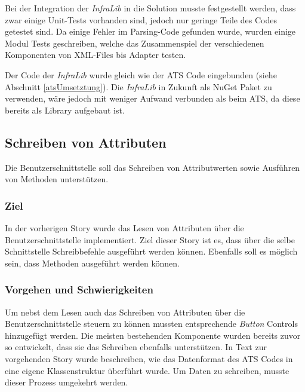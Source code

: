 Bei der Integration der \textit{InfraLib} in die Solution musste festgestellt werden, dass zwar einige Unit-Tests vorhanden sind, jedoch nur geringe Teile des Codes getestet sind.
Da einige Fehler im Parsing-Code gefunden wurde, wurden einige Modul Tests geschreiben, welche das Zusammenspiel der verschiedenen Komponenten von XML-Files bis Adapter testen.

Der Code der \textit{InfraLib} wurde gleich wie der \ac{ATS} Code eingebunden (siehe Abschnitt \ref{atsUmsetztung}).
Die \textit{InfraLib} in Zukunft als NuGet Paket zu verwenden, wäre jedoch mit weniger Aufwand verbunden als beim \ac{ATS}, da diese bereits als Library aufgebaut ist.

\subsection{Schreiben von Attributen}
\dq Die Benutzerschnittstelle soll das Schreiben von Attributwerten sowie Ausführen von Methoden unterstützen.\dq

\subsubsection{Ziel}
In der vorherigen Story wurde das Lesen von Attributen über die Benutzerschnittstelle implementiert.
Ziel dieser Story ist es, dass über die selbe Schnittstelle Schreibbefehle ausgeführt werden können.
Ebenfalls soll es möglich sein, dass Methoden ausgeführt werden können.

\subsubsection{Vorgehen und Schwierigkeiten}
Um nebst dem Lesen auch das Schreiben von Attributen über die Benutzerschnittstelle steuern zu können mussten entsprechende \textit{Button} Controls hinzugefügt werden.
Die meisten bestehenden Komponente wurden bereits zuvor so entwickelt, dass sie das Schreiben ebenfalls unterstützen.
In Text zur vorgehenden Story wurde beschreiben, wie das Datenformat des \ac{ATS} Codes in eine eigene Klassenstruktur überführt wurde.
Um Daten zu schreiben, musste dieser Prozess umgekehrt werden.

